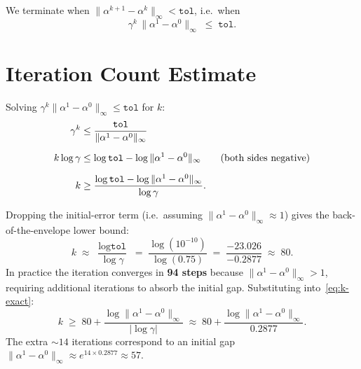 \documentclass[11pt]{article}
\begin{document}
We terminate when $\|\alpha^{k+1} - \alpha^k\|_\infty < \texttt{tol}$, i.e.\ when
\[
  \gamma^k\, \|\alpha^1 - \alpha^0\|_\infty \;\le\; \texttt{tol}.
\]

\section{Iteration Count Estimate}

Solving $\gamma^k \|\alpha^1 - \alpha^0\|_\infty \le \texttt{tol}$ for $k$:
\begin{align}
  \gamma^k &\le \frac{\texttt{tol}}{\|\alpha^1 - \alpha^0\|_\infty} \notag \\[6pt]
  k \log \gamma &\le \log\texttt{tol} - \log\|\alpha^1 - \alpha^0\|_\infty
  \qquad (\text{both sides negative}) \notag \\[6pt]
  k &\ge \frac{\log\texttt{tol} - \log\|\alpha^1 - \alpha^0\|_\infty}{\log \gamma}.
  \label{eq:k-exact}
\end{align}

Dropping the initial-error term (i.e.\ assuming $\|\alpha^1 - \alpha^0\|_\infty \approx 1$)
gives the back-of-the-envelope lower bound:
\[
  k \;\approx\; \frac{\log\texttt{tol}}{\log \gamma}
  \;=\; \frac{\log(10^{-10})}{\log(0.75)}
  \;=\; \frac{-23.026}{-0.2877}
  \;\approx\; 80.
\]
In practice the iteration converges in \textbf{94 steps} because
$\|\alpha^1 - \alpha^0\|_\infty > 1$, requiring additional iterations to
absorb the initial gap.  Substituting into~\eqref{eq:k-exact}:
\[
  k \;\ge\; 80 + \frac{\log\|\alpha^1 - \alpha^0\|_\infty}{|\log\gamma|}
  \;\approx\; 80 + \frac{\log\|\alpha^1 - \alpha^0\|_\infty}{0.2877}.
\]
The extra $\sim\!14$ iterations correspond to an initial gap
$\|\alpha^1 - \alpha^0\|_\infty \approx e^{14 \times 0.2877} \approx 57$.
\end{document}
